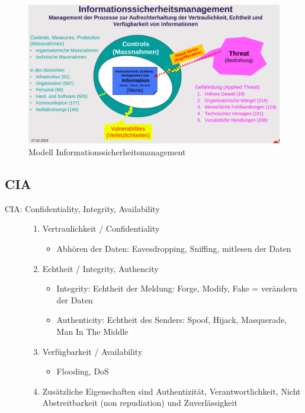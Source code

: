 \newpage
\begin{figure}[h]
	\centering
	\includegraphics[width=1.0\linewidth]{images/Informationssicherheitsmanagement}
	\caption{Modell Informationssicherheitsmanagement}
\end{figure}
\subsection{CIA}
\begin{description}
		\item[CIA: Confidentiality, Integrity, Availability] \hfill
		\begin{enumerate}
			\item Vertraulichkeit / Confidentiality
			\begin{itemize}
				\item Abhören der Daten: Eavesdropping, Sniffing, mitlesen der Daten
			\end{itemize}
			\item Echtheit / Integrity, Authencity
			\begin{itemize}
				\item Integrity: Echtheit der Meldung: Forge, Modify, Fake = verändern der Daten
				\item Authenticity: Echtheit des Senders: Spoof, Hijack, Masquerade, Man In The Middle
			\end{itemize}
			\item Verfügbarkeit / Availability
			\begin{itemize}
				\item Flooding, DoS
			\end{itemize}
			\item Zusätzliche Eigenschaften sind Authentizität, Verantwortlichkeit, Nicht Abstreitbarkeit (non repudiation) und Zuverlässigkeit
		\end{enumerate}	
\end{description}

